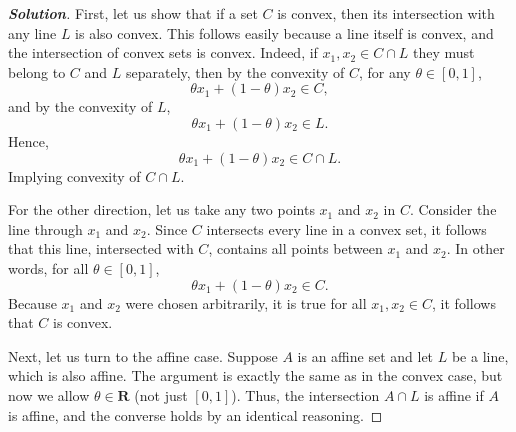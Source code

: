 \documentclass[12pt]{article}
\newenvironment{Solution}
  {\begin{proof}[\textbf{Solution}]}
  {\end{proof}}
\begin{document}
\begin{Solution}
First, let us show that if a set \(C\) is convex, then its intersection with any line \(L\) is also convex.
This follows easily because a line itself is convex, and the intersection of convex sets is convex.
Indeed, if \(x_1, x_2 \in C \cap L\) they must belong to \(C\) and \(L\) separately, then by the convexity of \(C\), for any \(\theta \in [0,1]\),
\[
    \theta x_1 + (1 - \theta) x_2 \in C,
\]
and by the convexity of \(L\),
\[
    \theta x_1 + (1 - \theta) x_2 \in L.
\]
Hence,
\[
    \theta x_1 + (1 - \theta) x_2 \in C \cap L.
\]
Implying convexity of $C \cap L$.

For the other direction, let us take any two points \(x_1\) and \(x_2\) in \(C\). 
Consider the line through \(x_1\) and \(x_2\). 
Since \(C\) intersects every line in a convex set, it follows that this line, intersected with \(C\), contains all points between \(x_1\) and \(x_2\). 
In other words, for all \(\theta \in [0,1]\),
\[
    \theta x_1 + (1 - \theta) x_2 \in C.
\]
Because \(x_1\) and \(x_2\) were chosen arbitrarily, it is true for all $x_1, x_2 \in C$, it follows that \(C\) is convex.

Next, let us turn to the affine case. 
Suppose \(A\) is an affine set and let \(L\) be a line, which is also affine. 
The argument is exactly the same as in the convex case, but now we allow \(\theta \in \mathbf{R}\) (not just \([0,1]\)). 
Thus, the intersection \(A \cap L\) is affine if \(A\) is affine, and the converse holds by an identical reasoning.
\end{Solution}
\end{document}
